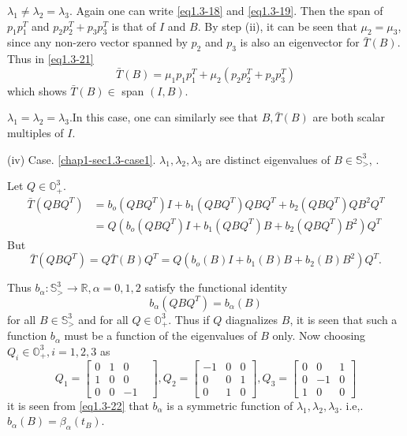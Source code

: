 \begin{case}\label{chap1-sec1.3-case2} %
  $\lambda_1 \neq \lambda_2 = \lambda_3$. Again one can write
   \eqref{eq1.3-18} and \eqref{eq1.3-19}. Then the span of $p_1 p_1^T$ and $p_2
   p_2^T +p_3p_3^T$ is that of $I$ and $B$. By step (ii), it can be
   seen that $\mu_2= \mu_3$, since any non-zero vector spanned by
   $p_2$ and $p_3$ is also an eigenvector for $\bar{T}(B)$. Thus in
   \eqref{eq1.3-21} 
   $$
   \bar{T}(B)= \mu_1 p_1 p_1^T + \mu_2 (p_2p_2^T + p_3 p_3^T)
   $$
   which shows $\bar{T}(B) \in$ span $(I, B)$. 
\end{case} 

 \begin{case}\label{chap1-sec1.3-case3} %
   $\lambda_1 = \lambda_2 = \lambda_3$.\pageoriginale In this case,
   one can similarly 
   see that $B, \bar{T}(B)$ are both scalar multiples of $I$.  
 \end{case} 
 
 (iv) Case. \ref{chap1-sec1.3-case1}. $\lambda_1, \lambda_2,
 \lambda_3$ are distinct 
 eigenvalues of $B \in \mathbb{S}^3_>$, .  
  
 Let $Q \in \mathbb{O}^3_+$. 
 \begin{align*}
   \bar{T}(QBQ^T)&= b_o (QBQ^T) I+b_1 (QBQ^T) QBQ^T +b_2 (QBQ^T) QB^2Q^T\\
   &= Q(b_o (QBQ^T)I + b_1(QBQ^T)B+b_2(QBQ^T)B^2)Q^T
 \end{align*} 
 But
 $$
 \bar{T}(QBQ^T)= Q\bar{T}(B) Q^T = Q(b_o(B)I +b_1(B)B+b_2(B)B^2)Q^T. 
 $$

 Thus $b_\alpha: \mathbb{S}^3_> \to \mathbb{R}, \alpha= 0, 1, 2$
 satisfy the functional identity  
 \begin{equation*}
   b_\alpha(QBQ^T)=b_\alpha(B) \tag{1.3-22}\label{eq1.3-22}
 \end{equation*} 
 for all $B \in \mathbb{S}^3_>$ and for all $Q \in
 \mathbb{O}^3_+$. Thus if $Q$ diagnalizes $B$, it is seen that such a
 function $b_\alpha$ must be a function of the eigenvalues of $B$
 only. Now choosing $Q_i \in \mathbb{O}^3_+, i = 1, 2, 3$ as
 $$
 Q_1=
 \begin{bmatrix}
   0 & 1 & 0 & \\
   1 & 0 & 0 \\
   0 & 0 & -1
 \end{bmatrix} , 
 Q_2=
 \begin{bmatrix}
   -1 & 0 & 0\\
   0& 0 &1\\
   0& 1& 0 
 \end{bmatrix} , 
 Q_3= 
 \begin{bmatrix}
   0& 0& 1\\
   0 & -1 &0\\
   1 &0 &0
 \end{bmatrix} 
 $$
 it is seen from \eqref{eq1.3-22} that $b_\alpha$ is a symmetric function of
 $\lambda_1, \lambda_2, \lambda_3$. i.e,. $b_\alpha(B)= \beta_\alpha(t_{B})$.
 
